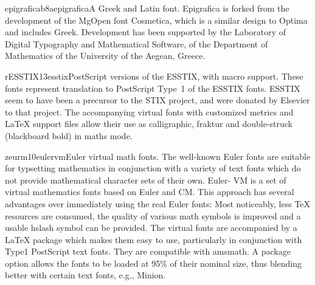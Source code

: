 \documentclass{ddltxtyp}
\begin{document}
\begin{package}{epigraficab8a}{epigrafica}{A Greek and Latin font.}
Epigrafica is forked from the development of the MgOpen font
Cosmetica, which is a similar design to Optima and includes
Greek. Development has been supported by the Laboratory of
Digital Typography and Mathematical Software, of the Department
of Mathematics of the University of the Aegean, Greece.
\end{package}

\begin{package}{rESSTIX13}{esstix}{PostScript versions of the ESSTIX, with macro support.}
These fonts represent translation to PostScript Type~1 of the
ESSTIX fonts. ESSTIX seem to have been a precursor to the STIX
project, and were donated by Elsevier to that project. The
accompanying virtual fonts with customized metrics and {\LaTeX}
support files allow their use as calligraphic, fraktur and
double-struck (blackboard bold) in maths mode.
\end{package}

\begin{package}{zeurm10}{eulervm}{Euler virtual math fonts.}
The well-known Euler fonts are suitable for typsetting
mathematics in conjunction with a variety of text fonts which
do not provide mathematical character sets of their own. Euler-%
VM is a set of virtual mathematics fonts based on Euler and CM.
This approach has several advantages over immediately using the
real Euler fonts: Most noticeably, less {\TeX} resources are
consumed, the quality of various math symbols is improved and a
usable hslash symbol can be provided. The virtual fonts are
accompanied by a {\LaTeX} package which makes them easy to use,
particularly in conjunction with Type1 PostScript text fonts.
They are compatible with amsmath. A package option allows the
fonts to be loaded at 95{\%} of their nominal size, thus blending
better with certain text fonts, e.g., Minion.
\end{package}
\end{document}
